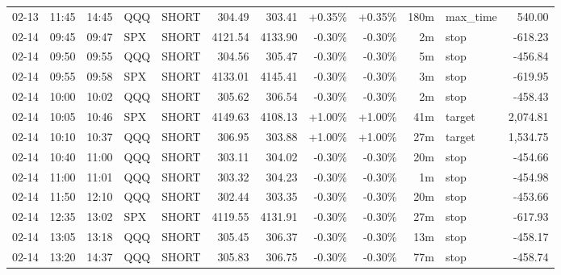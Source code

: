 \documentclass[11pt,a4paper,twoside]{article}
\begin{document}
\begin{center}
\begin{longtable}{>{\color{txtmain}}l l l l l r r r r r >{\color{txtmain}}l r}
02-13 & 11:45 & 14:45 & QQQ & SHORT & 304.49 & 303.41 & \textcolor{wingreen}{+0.35\%} & \textcolor{wingreen}{+0.35\%} & 180m & max\_time & \textcolor{wingreen}{540.00} \\
02-14 & 09:45 & 09:47 & SPX & SHORT & 4121.54 & 4133.90 & \textcolor{lossred}{-0.30\%} & \textcolor{lossred}{-0.30\%} & 2m & stop & \textcolor{lossred}{-618.23} \\
02-14 & 09:50 & 09:55 & QQQ & SHORT & 304.56 & 305.47 & \textcolor{lossred}{-0.30\%} & \textcolor{lossred}{-0.30\%} & 5m & stop & \textcolor{lossred}{-456.84} \\
02-14 & 09:55 & 09:58 & SPX & SHORT & 4133.01 & 4145.41 & \textcolor{lossred}{-0.30\%} & \textcolor{lossred}{-0.30\%} & 3m & stop & \textcolor{lossred}{-619.95} \\
02-14 & 10:00 & 10:02 & QQQ & SHORT & 305.62 & 306.54 & \textcolor{lossred}{-0.30\%} & \textcolor{lossred}{-0.30\%} & 2m & stop & \textcolor{lossred}{-458.43} \\
02-14 & 10:05 & 10:46 & SPX & SHORT & 4149.63 & 4108.13 & \textcolor{wingreen}{+1.00\%} & \textcolor{wingreen}{+1.00\%} & 41m & target & \textcolor{wingreen}{2,074.81} \\
02-14 & 10:10 & 10:37 & QQQ & SHORT & 306.95 & 303.88 & \textcolor{wingreen}{+1.00\%} & \textcolor{wingreen}{+1.00\%} & 27m & target & \textcolor{wingreen}{1,534.75} \\
02-14 & 10:40 & 11:00 & QQQ & SHORT & 303.11 & 304.02 & \textcolor{lossred}{-0.30\%} & \textcolor{lossred}{-0.30\%} & 20m & stop & \textcolor{lossred}{-454.66} \\
02-14 & 11:00 & 11:01 & QQQ & SHORT & 303.32 & 304.23 & \textcolor{lossred}{-0.30\%} & \textcolor{lossred}{-0.30\%} & 1m & stop & \textcolor{lossred}{-454.98} \\
02-14 & 11:50 & 12:10 & QQQ & SHORT & 302.44 & 303.35 & \textcolor{lossred}{-0.30\%} & \textcolor{lossred}{-0.30\%} & 20m & stop & \textcolor{lossred}{-453.66} \\
02-14 & 12:35 & 13:02 & SPX & SHORT & 4119.55 & 4131.91 & \textcolor{lossred}{-0.30\%} & \textcolor{lossred}{-0.30\%} & 27m & stop & \textcolor{lossred}{-617.93} \\
02-14 & 13:05 & 13:18 & QQQ & SHORT & 305.45 & 306.37 & \textcolor{lossred}{-0.30\%} & \textcolor{lossred}{-0.30\%} & 13m & stop & \textcolor{lossred}{-458.17} \\
02-14 & 13:20 & 14:37 & QQQ & SHORT & 305.83 & 306.75 & \textcolor{lossred}{-0.30\%} & \textcolor{lossred}{-0.30\%} & 77m & stop & \textcolor{lossred}{-458.74} \\

\end{longtable}
\end{center}
\end{document}
